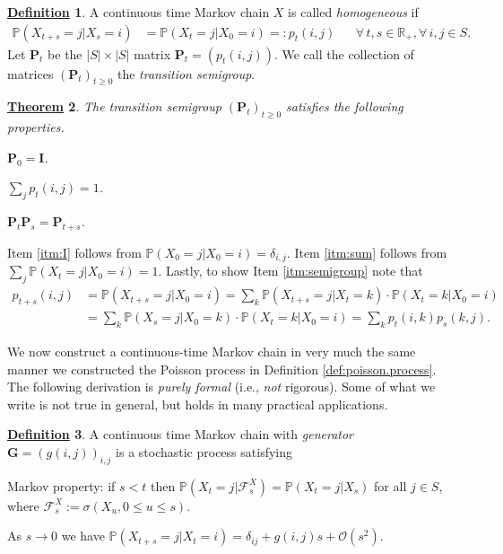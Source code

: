\documentclass[12pt]{book}
\numberwithin{equation}{chapter}
\theoremstyle{plain}
\newtheorem{theorem}{\underline{Theorem}}
\numberwithin{theorem}{section}
\theoremstyle{definition}
\newtheorem{definition}[theorem]{\underline{Definition}}
\numberwithin{exercise}{chapter}
\let\oldendproof\endproof
\renewenvironment{proof}[1][\proofname]{%
  \oldproof[\scshape\underline{#1}]%
}{\oldendproof}
\newcommand{\<}{\langle}
\renewcommand{\>}{\rangle}
\renewcommand{\(}{\left(}
\renewcommand{\)}{\right)}
\renewcommand{\[}{\left[}
\renewcommand{\]}{\right]}
\newcommand\Pb{\mathds{P}}
\newcommand\Rb{\mathds{R}}
\newcommand\Fc{\mathscr{F}}
\newcommand\Oc{\mathscr{O}}
\newcommand\sig{\sigma}
\newcommand\del{\delta}
\newcommand\Gv{\pmb{G}}
\newcommand\Iv{\pmb{I}}
\newcommand\Pv{\pmb{P}}
\begin{document}
\begin{definition}
A continuous time Markov chain $X$ is called \emph{homogeneous} if 
\begin{align}
\Pb( X_{t+s} = j | X_s = i)
	&=	\Pb( X_{t} = j | X_0 = i) =: p_t(i,j) &
	&		\forall \, t,s \in \Rb_+ , \forall \, i,j \in S .
\end{align}
Let $\Pv_t$ be the $|S| \times |S|$ matrix $\Pv_t = ( p_t(i,j) )$.  We call the collection of matrices $(\Pv_t)_{t \geq 0}$ the \emph{transition semigroup}.
\end{definition}

\begin{theorem}
The transition semigroup $(\Pv_t)_{t \geq 0}$ satisfies the following properties.
\begin{enumerate*}
\item $\Pv_0 = \Iv$.\label{itm:I}
\item $\sum_j p_t(i,j) = 1$.\label{itm:sum}
\item $\Pv_t \Pv_s = \Pv_{t+s}$.\label{itm:semigroup}
\end{enumerate*}
\end{theorem}

\begin{proof}
Item \ref{itm:I} follows from $\Pb( X_0 = j | X_0 = i) = \del_{i,j}$.
Item \ref{itm:sum} follows from $\sum_j \Pb( X_t = j | X_0 = i) = 1$.
Lastly, to show Item \ref{itm:semigroup} note that
\begin{align}
p_{t+s}(i,j)
	&=	\Pb( X_{t+s} = j | X_0 = i) 
	=	\sum_k \Pb( X_{t+s} = j | X_t = k) \cdot \Pb( X_t = k | X_0 = i) \\
	&=	\sum_k \Pb( X_{s} = j | X_0 = k) \cdot \Pb( X_t = k | X_0 = i) 
	=	\sum_k p_{t}(i,k) p_{s}(k,j) . \label{eq:chapman-kolmogorov}
\end{align}
\end{proof}

\noindent
We now construct a continuous-time Markov chain in very much the same manner we constructed the Poisson process in Definition \ref{def:poisson.process}.
The following derivation is \emph{purely formal} (i.e., \emph{not} rigorous).
Some of what we write is not true in general, but holds in many practical applications.

\begin{definition}
\label{def:ctmc}
A continuous time Markov chain with \emph{generator} $\Gv = (g(i,j))_{i,j}$ is a stochastic process satisfying
\begin{enumerate*}
\item Markov property: if $s<t$ then $\Pb( X_t = j | \Fc_s^X ) = \Pb( X_t = j | X_s )$ for all $j \in S$, where $\Fc_s^X := \sig(X_u, 0 \leq u \leq s)$.
\item As $s \to 0$ we have $\Pb( X_{t+s} = j | X_t = i ) =	\del_{ij} + g(i,j) s + \Oc(s^2)$. \label{itm:del+g}
\end{enumerate*}
\end{definition}
\end{document}
